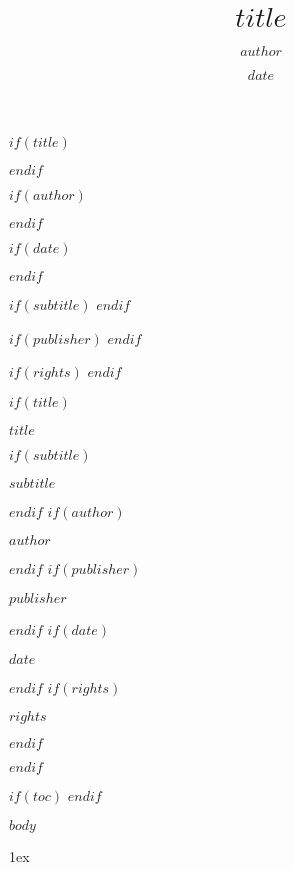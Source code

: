 \documentclass[a5paper, 10pt, twoside]{book}
\begin{document}

$if(title)$
\title{$title$}
$endif$

$if(author)$
\author{$author$}
$endif$

$if(date)$
\date{$date$}
$endif$

$if(subtitle)$
\newcommand{\subtitle}{$subtitle$}
$endif$

$if(publisher)$
\newcommand{\publisher}{$publisher$}
$endif$

$if(rights)$
\newcommand{\rights}{$rights$}
$endif$

$if(title)$
\begin{titlepage}
    \centering
    {\huge\bfseries $title$\par}
    $if(subtitle)$
    \vspace{0.5cm}
    {\large $subtitle$\par}
    $endif$
    \vspace{2cm}
    $if(author)$
    {\large $author$\par}
    $endif$
    \vfill
    $if(publisher)$
    {\large $publisher$\par}
    $endif$
    \vspace{0.5cm}
    $if(date)$
    {\large $date$\par}
    $endif$
    $if(rights)$
    \vspace{0.5cm}
    {\small $rights$\par}
    $endif$
\end{titlepage}
\cleardoublepage
$endif$

$if(toc)$
\tableofcontents
$endif$

\vspace*{8\baselineskip}

$body$

\clearpage
\begingroup
\parindent 0pt
\parskip 1ex
\def\enotesize{\small}
\theendnotes
\endgroup
\end{document}
